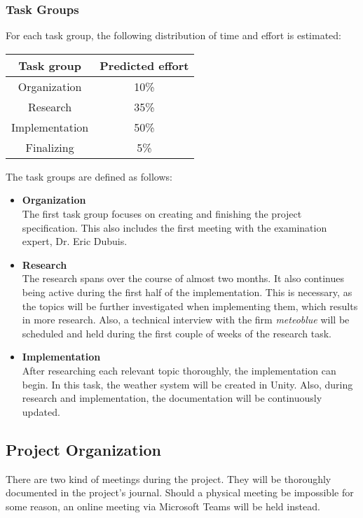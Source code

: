 \subsubsection{Task Groups}
For each task group, the following distribution of time and effort is estimated:
\emptyline
\begin{tabular}{|c|c|}
    \hline
    \textbf{Task group}  & \textbf{Predicted effort}\\ \hline
    Organization        & 10\%                      \\ \hline
    Research            & 35\%                      \\ \hline
    Implementation      & 50\%                      \\ \hline
    Finalizing          & 5\%                       \\ \hline
\end{tabular}
\vspace{\baselineskip}

\noindent
The task groups are defined as follows:

\begin{itemize}
    \item \textbf{Organization} \\
    The first task group focuses on creating and finishing the project specification. This also includes the first meeting with the examination expert, Dr. Eric Dubuis.
    
    \item \textbf{Research} \\
    The research spans over the course of almost two months. 
    It also continues being active during the first half of the implementation.
    This is necessary, as the topics will be further investigated when implementing them, which results in more research.
    Also, a technical interview with the firm \emph{meteoblue} will be scheduled and held during the first couple of weeks of the research task.

    \item \textbf{Implementation} \\
    After researching each relevant topic thoroughly, the implementation can begin. In this task, the weather system will be created in Unity.
    Also, during research and implementation, the documentation will be continuously updated.
\end{itemize}

\subsection{Project Organization}
There are two kind of meetings during the project. They will be thoroughly documented in the project's journal.
Should a physical meeting be impossible for some reason, an online meeting via Microsoft Teams will be held instead.

